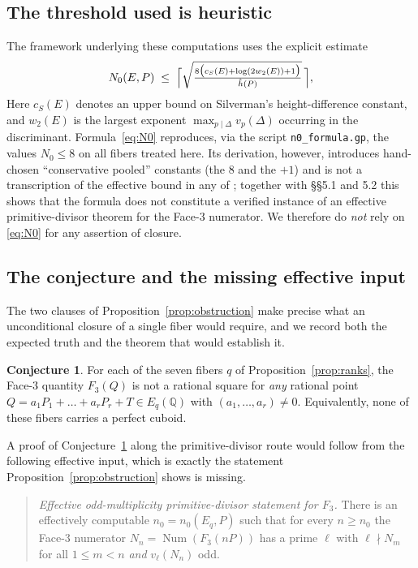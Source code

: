 \documentclass[11pt,reqno]{amsart}
\theoremstyle{plain}
\theoremstyle{definition}
\newtheorem{conjecture}[theorem]{Conjecture}
\newcommand{\Q}{\mathbb{Q}}
\newcommand{\hath}{\hat{h}}
\DeclareMathOperator{\Num}{Num}
\begin{document}
\subsection{The threshold used is heuristic}
The framework underlying these computations uses the explicit estimate
\begin{equation}\label{eq:N0}
  N_0(E,P)\;\le\;\Bigl\lceil
   \sqrt{\tfrac{8\bigl(c_S(E)+\log(2w_2(E))+1\bigr)}{\hath(P)}}\,\Bigr\rceil,
\end{equation}
Here $c_S(E)$ denotes an upper bound on Silverman's height-difference constant,
and $w_2(E)$ is the largest exponent $\max_{p\mid\Delta}v_p(\Delta)$ occurring in
the discriminant. Formula~\eqref{eq:N0} reproduces, via the script
\texttt{n0\_formula.gp}, the values $N_0\le 8$ on all fibers treated here.
Its derivation, however, introduces hand-chosen ``conservative pooled''
constants (the $8$ and the $+1$) and is not a transcription of the effective
bound in any of \cite{ingram-silverman,verzobio,ingram07}; together with
\S\S5.1 and 5.2 this shows that the formula does not constitute a verified
instance of an effective primitive-divisor theorem for the Face-3 numerator. We
therefore do \emph{not} rely on \eqref{eq:N0} for any assertion of closure.

\subsection{The conjecture and the missing effective input}\label{sec:conjecture}
The two clauses of Proposition~\ref{prop:obstruction} make precise what an
unconditional closure of a single fiber would require, and we record both the
expected truth and the theorem that would establish it.

\begin{conjecture}\label{conj:main}
For each of the seven fibers $q$ of Proposition~\ref{prop:ranks}, the Face-3
quantity $F_3(Q)$ is not a rational square for \emph{any} rational point
$Q=a_1P_1+\dots+a_rP_r+T\in E_q(\Q)$ with $(a_1,\dots,a_r)\neq 0$. Equivalently,
none of these fibers carries a perfect cuboid.
\end{conjecture}

A proof of Conjecture~\ref{conj:main} along the primitive-divisor route would
follow from the following effective input, which is exactly the statement
Proposition~\ref{prop:obstruction} shows is missing.

\begin{quote}
\emph{Effective odd-multiplicity primitive-divisor statement for $F_3$.} There
is an effectively computable $n_0=n_0(E_q,P)$ such that for every $n\ge n_0$ the
Face-3 numerator $N_n=\Num(F_3(nP))$ has a prime $\ell$ with $\ell\nmid N_m$ for
all $1\le m<n$ \emph{and} $v_\ell(N_n)$ odd.
\end{quote}
\end{document}
